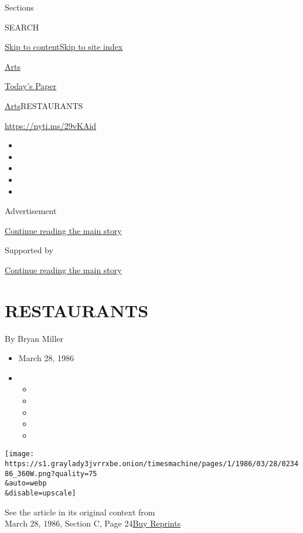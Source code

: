 Sections

SEARCH

\protect\hyperlink{site-content}{Skip to
content}\protect\hyperlink{site-index}{Skip to site index}

\href{https://www.nytimes3xbfgragh.onion/section/arts}{Arts}

\href{https://myaccount.nytimes3xbfgragh.onion/auth/login?response_type=cookie\&client_id=vi}{}

\href{https://www.nytimes3xbfgragh.onion/section/todayspaper}{Today's
Paper}

\href{/section/arts}{Arts}\textbar{}RESTAURANTS

\url{https://nyti.ms/29vKAid}

\begin{itemize}
\item
\item
\item
\item
\item
\end{itemize}

Advertisement

\protect\hyperlink{after-top}{Continue reading the main story}

Supported by

\protect\hyperlink{after-sponsor}{Continue reading the main story}

\hypertarget{restaurants}{%
\section{RESTAURANTS}\label{restaurants}}

By Bryan Miller

\begin{itemize}
\item
  March 28, 1986
\item
  \begin{itemize}
  \item
  \item
  \item
  \item
  \item
  \end{itemize}
\end{itemize}

\texttt{[image: https://s1.graylady3jvrrxbe.onion/timesmachine/pages/1/1986/03/28/023486\_360W.png?quality=75\\\&auto=webp\\\&disable=upscale]}

See the article in its original context from\\
March 28, 1986, Section C, Page
24\href{https://store.nytimes3xbfgragh.onion/collections/new-york-times-page-reprints?utm_source=nytimes\&utm_medium=article-page\&utm_campaign=reprints}{Buy
Reprints}


